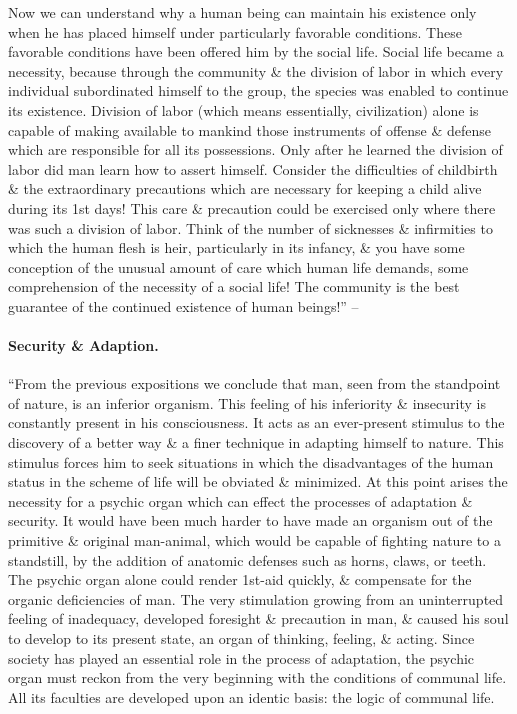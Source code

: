 \documentclass{article}
\begin{document}
Now we can understand why a human being can maintain his existence only when he has placed himself under particularly favorable conditions. These favorable conditions have been offered him by the social life. Social life became a necessity, because through the community \& the division of labor in which every individual subordinated himself to the group, the species was enabled to continue its existence. Division of labor (which means essentially, civilization) alone is capable of making available to mankind those instruments of offense \& defense which are responsible for all its possessions. Only after he learned the division of labor did man learn how to assert himself. Consider the difficulties of childbirth \& the extraordinary precautions which are necessary for keeping a child alive during its 1st days! This care \& precaution could be exercised only where there was such a division of labor. Think of the number of sicknesses \& infirmities to which the human flesh is heir, particularly in its infancy, \& you have some conception of the unusual amount of care which human life demands, some comprehension of the necessity of a social life! The community is the best guarantee of the continued existence of human beings!'' -- \cite[pp. 27--29]{Adler_human_nature}

\paragraph{Security \& Adaption.} ``From the previous expositions we conclude that man, seen from the standpoint of nature, is an inferior organism. This feeling of his inferiority \& insecurity is constantly present in his consciousness. It acts as an ever-present stimulus to the discovery of a better way \& a finer technique in adapting himself to nature. This stimulus forces him to seek situations in which the disadvantages of the human status in the scheme of life will be obviated \& minimized. At this point arises the necessity for a psychic organ which can effect the processes of adaptation \& security. It would have been much harder to have made an organism out of the primitive \& original man-animal, which would be capable of fighting nature to a standstill, by the addition of anatomic defenses such as horns, claws, or teeth. The psychic organ alone could render 1st-aid quickly, \& compensate for the organic deficiencies of man. The very stimulation growing from an uninterrupted feeling of inadequacy, developed foresight \& precaution in man, \& caused his soul to develop to its present state, an organ of thinking, feeling, \& acting. Since society has played an essential role in the process of adaptation, the psychic organ must reckon from the very beginning with the conditions of communal life. All its faculties are developed upon an identic basis: the logic of communal life.
\end{document}
